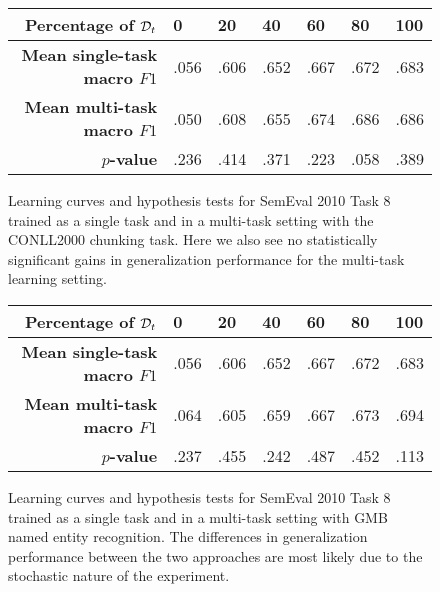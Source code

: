 \begin{figure}[h]
	\centering
	
	\vspace*{1cm}
	
	\begin{tabular}{r | l | l | l | l | l | l}
		\textbf{Percentage of $\mathcal{D}_t$} & 0 & 20 & 40 & 60 & 80 & 100 \\  \hline
		\textbf{Mean single-task macro $F1$} & .056 & .606 & .652 & .667 & .672 & .683\\
		\textbf{Mean multi-task macro $F1$} & .050 & .608 & .655 & .674 & .686  & .686\\
		$p$\textbf{-value} & .236  & .414 & .371 & .223 & .058 & .389
	\end{tabular}
	\caption{Learning curves and hypothesis tests for SemEval 2010 Task 8 trained as a single task and in a multi-task setting with the CONLL2000 chunking task. Here we also see no statistically significant gains in generalization performance for the multi-task learning setting.}
\end{figure}
\begin{figure}[h]
	\centering
	
	\vspace*{1cm}
	
	\begin{tabular}{r | l | l | l | l | l | l}
		\textbf{Percentage of $\mathcal{D}_t$} & 0 & 20 & 40 & 60 & 80 & 100 \\  \hline
		\textbf{Mean single-task macro $F1$} & .056 & .606 & .652 & .667 & .672 & .683\\
		\textbf{Mean multi-task macro $F1$} & .064 & .605 & .659 & .667 & .673 & .694\\
		$p$\textbf{-value} & .237 & .455 & .242 & .487 & .452 & .113
	\end{tabular}
	\caption{Learning curves and hypothesis tests for SemEval 2010 Task 8 trained as a single task and in a multi-task setting with GMB named entity recognition. The differences in generalization performance between the two approaches are most likely due to the stochastic nature of the experiment.}
\end{figure}
\FloatBarrier
